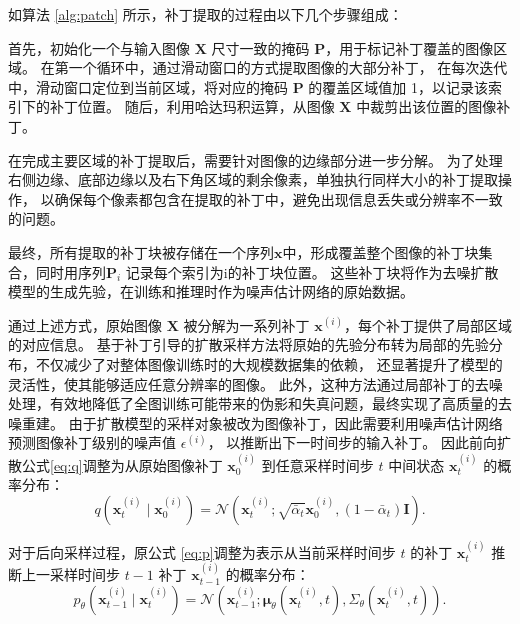 如算法 \ref{alg:patch} 所示，补丁提取的过程由以下几个步骤组成：

首先，初始化一个与输入图像 $\bm{X}$ 尺寸一致的掩码 $\bm{P}$，用于标记补丁覆盖的图像区域。
在第一个循环中，通过滑动窗口的方式提取图像的大部分补丁，
在每次迭代中，滑动窗口定位到当前区域，将对应的掩码 $\bm{P}$ 的覆盖区域值加 1，以记录该索引下的补丁位置。
随后，利用哈达玛积运算，从图像 $\bm{X}$ 中裁剪出该位置的图像补丁。

在完成主要区域的补丁提取后，需要针对图像的边缘部分进一步分解。
为了处理右侧边缘、底部边缘以及右下角区域的剩余像素，单独执行同样大小的补丁提取操作，
以确保每个像素都包含在提取的补丁中，避免出现信息丢失或分辨率不一致的问题。

最终，所有提取的补丁块被存储在一个序列$\mathbf{x}$中，形成覆盖整个图像的补丁块集合，同时用序列$\bm{P}_i$ 记录每个索引为i的补丁块位置。
这些补丁块将作为去噪扩散模型的生成先验，在训练和推理时作为噪声估计网络的原始数据。


通过上述方式，原始图像 $\bm{X}$ 被分解为一系列补丁 ${\mathbf{x}^{(i)}}$，每个补丁提供了局部区域的对应信息。
基于补丁引导的扩散采样方法将原始的先验分布转为局部的先验分布，不仅减少了对整体图像训练时的大规模数据集的依赖，
还显著提升了模型的灵活性，使其能够适应任意分辨率的图像。
此外，这种方法通过局部补丁的去噪处理，有效地降低了全图训练可能带来的伪影和失真问题，最终实现了高质量的去噪重建。
由于扩散模型的采样对象被改为图像补丁，因此需要利用噪声估计网络预测图像补丁级别的噪声值 $\epsilon^{(i)}$，
以推断出下一时间步的输入补丁。
因此前向扩散公式\eqref{eq:q}调整为从原始图像补丁 $\mathbf{x}^{(i)}_0$ 到任意采样时间步 $t$ 中间状态 $\mathbf{x}^{(i)}_t$ 的概率分布：
\begin{equation}
    \label{eq:q-patch}
        q\left(\mathbf{x}^{(i)}_t \mid \mathbf{x}^{(i)}_0\right)=\mathcal{N}\left(\mathbf{x}^{(i)}_t ; \sqrt{\bar{\alpha}_t} \mathbf{x}^{(i)}_0,\left(1-\bar{\alpha}_t\right) \mathbf{I}\right).
\end{equation}

对于后向采样过程，原公式 \eqref{eq:p}调整为表示从当前采样时间步 $t$ 的补丁 $\mathbf{x}^{(i)}_t$ 推断上一采样时间步 $t-1$ 补丁 $\mathbf{x}^{(i)}_{t-1}$ 的概率分布：
\begin{equation}
    \label{eq:p-patch}
    p_\theta\left(\mathbf{x}^{(i)}_{t-1} \mid \mathbf{x}^{(i)}_t\right) =\mathcal{N}\left(\mathbf{x}^{(i)}_{t-1} ; \boldsymbol{\mu}_\theta\left(\mathbf{x}^{(i)}_t, t\right), \Sigma_\theta\left(\mathbf{x}^{(i)}_t, t\right)\right).
\end{equation}

